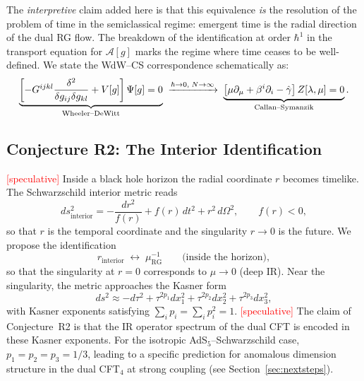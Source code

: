 \documentclass[11pt,a4paper]{article}
\begin{document}
The \emph{interpretive} claim added here is that this equivalence \emph{is} the resolution of the problem of time in the semiclassical regime: emergent time is the radial direction of the dual RG flow. The breakdown of the identification at order $\hbar^1$ in the transport equation for $\mathcal{A}[g]$ marks the regime where time ceases to be well-defined. We state the WdW--CS correspondence schematically as:
\begin{equation}
  \underbrace{%
    \left[-G^{ijkl}\frac{\delta^2}{\delta g_{ij}\delta g_{kl}} + V[g]\right]
    \Psi[g] = 0%
  }_{\text{Wheeler--DeWitt}}
  \;\xrightarrow{\hbar\to 0,\;N\to\infty}\;
  \underbrace{%
    \left[\mu\partial_\mu + \beta^{i}\partial_{i} - \hat{\gamma}\right]
    Z[\lambda,\mu] = 0%
  }_{\text{Callan--Symanzik}}.
  \label{eq:5}
\end{equation}

\subsection{Conjecture R2: The Interior Identification}
\label{sec:R2}

\textcolor{red}{[speculative]} Inside a black hole horizon the radial coordinate $r$ becomes timelike. The Schwarzschild interior metric reads
\begin{equation}
  ds^2_{\mathrm{interior}}
  = -\frac{dr^2}{f(r)} + f(r)\,dt^2 + r^2\,d\Omega^2,
  \qquad f(r) < 0,
  \label{eq:6}
\end{equation}
so that $r$ is the temporal coordinate and the singularity $r\to 0$ is the future. We propose the identification
\begin{equation}
  r_{\mathrm{interior}} \;\longleftrightarrow\; \mu^{-1}_{\mathrm{RG}}
  \qquad \text{(inside the horizon)},
  \label{eq:7}
\end{equation}
so that the singularity at $r=0$ corresponds to $\mu \to 0$ (deep IR). Near the singularity, the metric approaches the Kasner form
\begin{equation}
  ds^2 \approx -d\tau^2
  + \tau^{2p_1}dx_1^2
  + \tau^{2p_2}dx_2^2
  + \tau^{2p_3}dx_3^2,
  \label{eq:8}
\end{equation}
with Kasner exponents satisfying $\sum_i p_i = \sum_i p_i^2 = 1$. \textcolor{red}{[speculative]} The claim of Conjecture~R2 is that the IR operator spectrum of the dual CFT is encoded in these Kasner exponents. For the isotropic AdS$_5$--Schwarzschild case, $p_1 = p_2 = p_3 = 1/3$, leading to a specific prediction for anomalous dimension structure in the dual CFT$_4$ at strong coupling (see Section~\ref{sec:nextsteps}).
\end{document}
